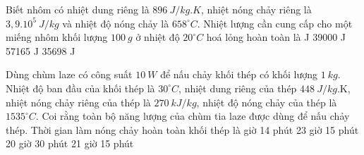 			\begin{ex} 
				Biết nhôm có nhiệt dung riêng là $896 \ J / kg . K$, nhiệt nóng chảy riêng là $3,9 . 10^{5} \ J /kg$ và nhiệt độ nóng chảy là $658^\circ C$. Nhiệt lượng cần cung cấp cho một miếng nhôm khối lượng $100 \ g$ ở nhiệt độ $20^\circ C$ hoá lỏng hoàn toàn là
				\choice
				{ J}
				{39000 J}
				{57165 J}
				{35698 J}
			\end{ex}
			\begin{ex} 
				Dùng chùm laze có công suất $10\ W$ để nấu chảy khối thép có khối lượng $1 \ kg$. Nhiệt độ ban đầu của khối thép là  $30^\circ C$, nhiệt dung riêng của thép $448 \ J /kg$.K, nhiệt nóng chảy riêng của thép là $270 \ kJ /kg$, nhiệt độ nóng chảy của thép là $1535^\circ C$. Coi rằng toàn bộ năng lượng của chùm tia laze được dùng để nấu chảy thép. Thời gian làm nóng chảy hoàn toàn khối thép là
				\choice
				{ giờ 14 phút}
				{23 giờ 15 phút}
				{20 giờ 30 phút}
				{21 giờ 15 phút}
			\end{ex}
